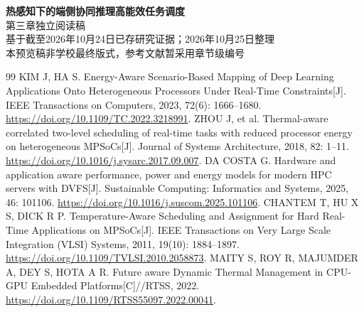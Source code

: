 \documentclass[UTF8,a4paper,12pt,openany,fontset=none]{ctexbook}
\begin{document}
\frontmatter
\begin{center}
 {\large\bfseries 热感知下的端侧协同推理高能效任务调度}\\[9pt]
 { 第三章独立阅读稿}\\[5pt]
 {\small 基于截至2026年10月24日已存研究证据；2026年10月25日整理}\\[6pt]
 {\small 本预览稿非学校最终版式，参考文献暂采用章节级编号}
\end{center}
\vspace{10pt}
\tableofcontents
\mainmatter
\setcounter{chapter}{2}

\clearpage
\begin{thebibliography}{99}
KIM J, HA S.
Energy-Aware Scenario-Based Mapping of Deep Learning Applications Onto Heterogeneous Processors Under Real-Time Constraints[J].
IEEE Transactions on Computers, 2023, 72(6): 1666--1680.
\url{https://doi.org/10.1109/TC.2022.3218991}.
ZHOU J, et al.
Thermal-aware correlated two-level scheduling of real-time tasks with reduced processor energy on heterogeneous MPSoCs[J].
Journal of Systems Architecture, 2018, 82: 1--11.
\url{https://doi.org/10.1016/j.sysarc.2017.09.007}.
DA COSTA G.
Hardware and application aware performance, power and energy models for modern HPC servers with DVFS[J].
Sustainable Computing: Informatics and Systems, 2025, 46: 101106.
\url{https://doi.org/10.1016/j.suscom.2025.101106}.
CHANTEM T, HU X S, DICK R P.
Temperature-Aware Scheduling and Assignment for Hard Real-Time Applications on MPSoCs[J].
IEEE Transactions on Very Large Scale Integration (VLSI) Systems, 2011, 19(10): 1884--1897.
\url{https://doi.org/10.1109/TVLSI.2010.2058873}.
MAITY S, ROY R, MAJUMDER A, DEY S, HOTA A R.
Future aware Dynamic Thermal Management in CPU-GPU Embedded Platforms[C]//RTSS, 2022.
\url{https://doi.org/10.1109/RTSS55097.2022.00041}.
\end{thebibliography}
\end{document}

